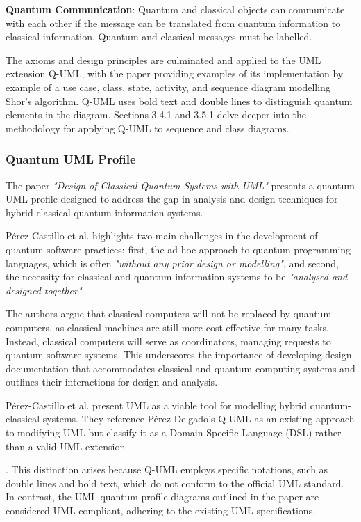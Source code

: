 \documentclass{article}
\begin{document}
{\textbf{Quantum Communication}: Quantum and classical objects can communicate with each other if the message can be translated from quantum information to classical information. Quantum and classical messages must be labelled.

The axioms and design principles are culminated and applied to the UML extension Q-UML, with the paper providing examples of its implementation by example of a use case, class, state, activity, and sequence diagram modelling Shor's algorithm\cite{Pérez-Delgado2022}. Q-UML uses bold text and double lines to distinguish quantum elements in the diagram. Sections 3.4.1 and 3.5.1 delve deeper into the methodology for applying Q-UML to sequence and class diagrams.

\subsubsection{Quantum UML Profile}

The paper \textit{"Design of Classical-Quantum Systems with UML"} presents a quantum UML profile designed to address the gap in analysis and design techniques for hybrid classical-quantum information systems\cite{Pérez-Castillo2022}. 

Pérez-Castillo et al. highlights two main challenges in the development of quantum software practices: first, the ad-hoc approach to quantum programming languages, which is often \textit{"without any prior design or modelling"}\cite{Pérez-Castillo2022}, and second, the necessity for classical and quantum information systems to be \textit{"analysed and designed together"}\cite{Pérez-Castillo2022}. 

The authors argue that classical computers will not be replaced by quantum computers, as classical machines are still more cost-effective for many tasks. Instead, classical computers will serve as coordinators, managing requests to quantum software systems\cite{Pérez-Castillo2022}. This underscores the importance of developing design documentation that accommodates classical and quantum computing systems and outlines their interactions for design and analysis.

Pérez-Castillo et al. present UML as a viable tool for modelling hybrid quantum-classical systems. They reference Pérez-Delgado's Q-UML as an existing approach to modifying UML but classify it as a Domain-Specific Language (DSL) rather than a valid UML extension\cite{Pérez-Castillo2022}}. This distinction arises because Q-UML employs specific notations, such as double lines and bold text, which do not conform to the official UML standard. In contrast, the UML quantum profile diagrams outlined in the paper are considered UML-compliant, adhering to the existing UML specifications\cite{Pérez-Castillo2022}. 
\end{document}
